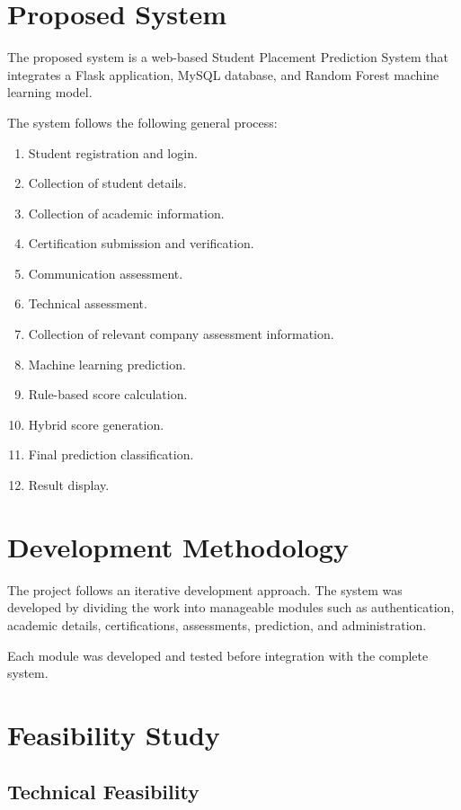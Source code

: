 \documentclass[12pt,a4paper]{report}
\begin{document}
\section{Proposed System}

The proposed system is a web-based Student Placement Prediction
System that integrates a Flask application, MySQL database, and
Random Forest machine learning model.

The system follows the following general process:

\begin{enumerate}
    \item Student registration and login.
    \item Collection of student details.
    \item Collection of academic information.
    \item Certification submission and verification.
    \item Communication assessment.
    \item Technical assessment.
    \item Collection of relevant company assessment information.
    \item Machine learning prediction.
    \item Rule-based score calculation.
    \item Hybrid score generation.
    \item Final prediction classification.
    \item Result display.
\end{enumerate}

\section{Development Methodology}

The project follows an iterative development approach. The system
was developed by dividing the work into manageable modules such
as authentication, academic details, certifications,
assessments, prediction, and administration.

Each module was developed and tested before integration with the
complete system.

\section{Feasibility Study}

\subsection{Technical Feasibility}
\end{document}
